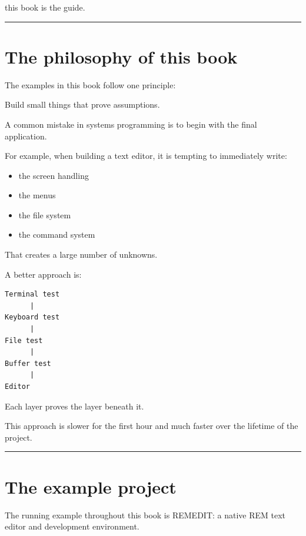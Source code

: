 \documentclass[
  oneside,
  openany]{book}
\providecommand{\tightlist}{%
  \setlength{\itemsep}{0pt}\setlength{\parskip}{0pt}}
\begin{document}
this book is the guide.

\begin{center}\rule{0.5\linewidth}{0.5pt}\end{center}

\hypertarget{the-philosophy-of-this-book}{%
\section{The philosophy of this
book}\label{the-philosophy-of-this-book}}

The examples in this book follow one principle:

Build small things that prove assumptions.

A common mistake in systems programming is to begin with the final
application.

For example, when building a text editor, it is tempting to immediately
write:

\begin{itemize}
\tightlist
\item
  the screen handling
\item
  the menus
\item
  the file system
\item
  the command system
\end{itemize}

That creates a large number of unknowns.

A better approach is:

\begin{verbatim}
Terminal test
      |
Keyboard test
      |
File test
      |
Buffer test
      |
Editor
\end{verbatim}

Each layer proves the layer beneath it.

This approach is slower for the first hour and much faster over the
lifetime of the project.

\begin{center}\rule{0.5\linewidth}{0.5pt}\end{center}

\hypertarget{the-example-project}{%
\section{The example project}\label{the-example-project}}

The running example throughout this book is REMEDIT: a native REM text
editor and development environment.
\end{document}
